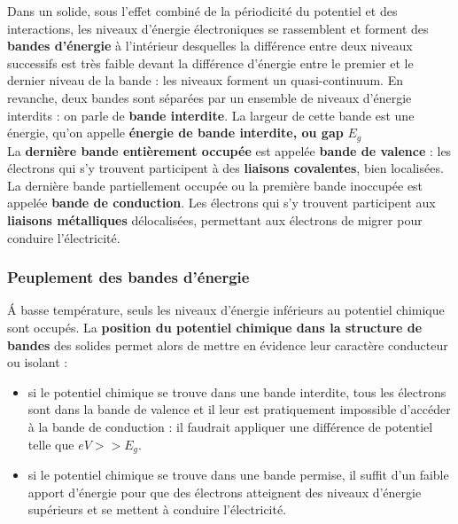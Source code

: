 \documentclass[11pt,a4paper]{report}
\begin{document}
Dans un solide, sous l'effet combiné de la périodicité du potentiel et des interactions, les niveaux d'énergie électroniques se rassemblent et forment des \textbf{bandes d'énergie} à l'intérieur desquelles la différence entre deux niveaux successifs est très faible devant la différence d'énergie entre le premier et le dernier niveau de la bande : les niveaux forment un quasi-continuum. En revanche, deux bandes sont séparées par un ensemble de niveaux d'énergie interdits : on parle de \textbf{bande interdite}. La largeur de cette bande est une énergie, qu'on appelle \textbf{énergie de bande interdite, ou gap} $E_g$\\ 

La \textbf{dernière bande entièrement occupée} est appelée \textbf{bande de valence} : les électrons qui s'y trouvent participent à des \textbf{liaisons covalentes}, bien localisées. La dernière bande partiellement occupée ou la première bande inoccupée est appelée \textbf{bande de conduction}. Les électrons qui s'y trouvent participent aux \textbf{liaisons métalliques} délocalisées, permettant aux électrons de migrer pour conduire l'électricité.\\

\subsubsection{Peuplement des bandes d'énergie}

\'A basse température, seuls les niveaux d'énergie inférieurs au potentiel chimique sont occupés. La \textbf{position du potentiel chimique dans la structure de bandes} des solides permet alors de mettre en évidence leur caractère conducteur ou isolant :
\begin{itemize}
	\item si le potentiel chimique se trouve dans une bande interdite, tous les électrons sont dans la bande de valence et il leur est pratiquement impossible d'accéder à la bande de conduction : il faudrait appliquer une différence de potentiel telle que $eV >> E_g$.\\
	\item si le potentiel chimique se trouve dans une bande permise, il suffit d'un faible apport d'énergie pour que des électrons atteignent des niveaux d'énergie supérieurs et se mettent à conduire l'électricité.\\
\end{itemize}
\end{document}
